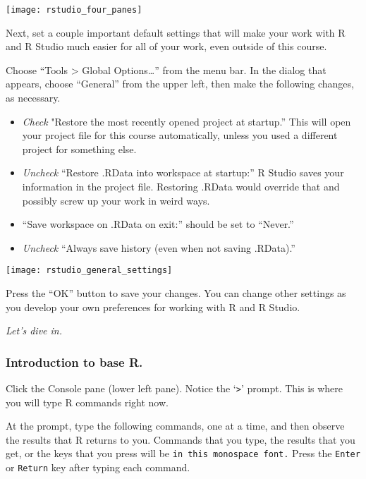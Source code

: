 \documentclass[11pt]{article}
\begin{document}
\texttt{[image: rstudio\_four\_panes]}

Next, set a couple important default settings that will make your work with R and R Studio much easier for all of your work, even outside of this course.

Choose “Tools > Global Options\dots” from the menu bar. In the dialog that appears, choose “General” from the upper left, then make the following changes, as necessary. 

\begin{multicols}{2}

\begin{itemize}
	\item \textit{Check} "Restore the most recently opened project at startup.” This will open your project file for this course automatically, unless you used a different project for something else.
	
	\item \textit{Uncheck} “Restore .RData into workspace at startup:” R Studio saves your information in the project file. Restoring .RData would override that and possibly screw up your work in weird ways.
	
	\item “Save workspace on .RData on exit:” should be set to “Never.”
	
	\item \textit{Uncheck} “Always save history (even when not saving .RData).”
\end{itemize}

\columnbreak

\quad\texttt{[image: rstudio\_general\_settings]}
\end{multicols}

Press the “OK” button to save your changes. You can change other settings as you develop your own preferences for working with R and R Studio.

\textit{Let's dive in.}


\subsubsection*{Introduction to base R.}

Click the Console pane (lower left pane). Notice the `\texttt{\textgreater{}}' prompt. This is where you will type R commands right now.

At the prompt, type the following commands, one at a time, and then
observe the results that R returns to you. Commands that you type, the
results that you get, or the keys that you press will be \texttt{in this monospace
font.} Press the \texttt{Enter} or \texttt{Return} key after typing each command.
\end{document}
